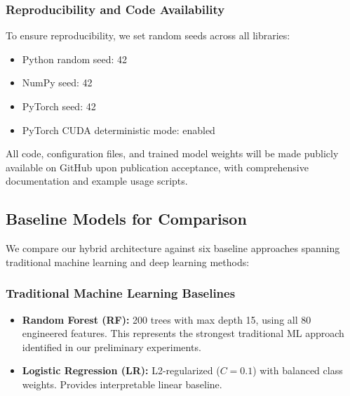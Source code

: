 \documentclass[conference]{IEEEtran}
\begin{document}
\subsubsection{Reproducibility and Code Availability}
To ensure reproducibility, we set random seeds across all libraries:
\begin{itemize}
\item Python random seed: 42
\item NumPy seed: 42
\item PyTorch seed: 42
\item PyTorch CUDA deterministic mode: enabled
\end{itemize}

All code, configuration files, and trained model weights will be made publicly available on GitHub upon publication acceptance, with comprehensive documentation and example usage scripts.

\subsection{Baseline Models for Comparison}

We compare our hybrid architecture against six baseline approaches spanning traditional machine learning and deep learning methods:

\subsubsection{Traditional Machine Learning Baselines}
\begin{itemize}
\item \textbf{Random Forest (RF):} 200 trees with max depth 15, using all 80 engineered features. This represents the strongest traditional ML approach identified in our preliminary experiments.

\item \textbf{Logistic Regression (LR):} L2-regularized ($C=0.1$) with balanced class weights. Provides interpretable linear baseline.
\end{itemize}
\end{document}
